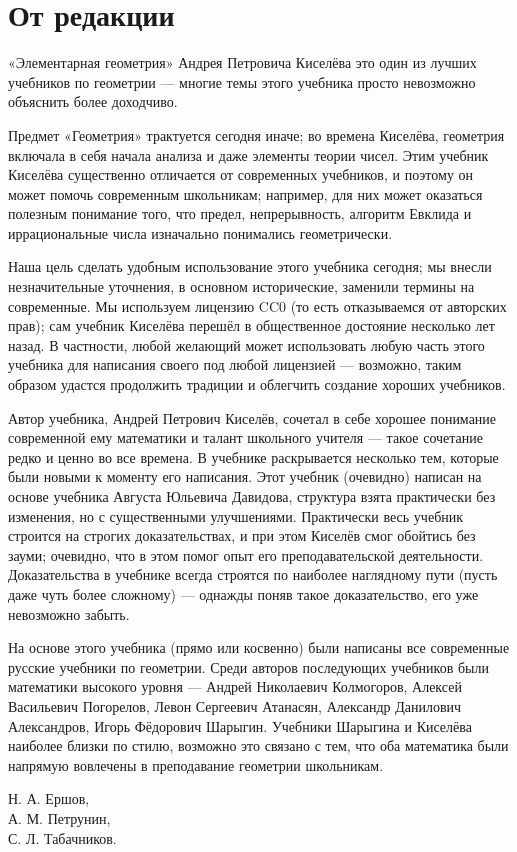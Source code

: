 \section*{От редакции}


«Элементарная геометрия» Андрея Петровича Киселёва это один из лучших учебников по геометрии ---
многие темы этого учебника просто невозможно объяснить более доходчиво.

Предмет «Геометрия» трактуется сегодня иначе;
во времена Киселёва, геометрия включала в себя начала анализа и даже элементы теории чисел.
Этим учебник Киселёва существенно отличается от современных учебников, и поэтому он может помочь современным школьникам;
например, для них может оказаться полезным понимание того, что предел, непрерывность, алгоритм Евклида и иррациональные числа изначально понимались геометрически.

Наша цель сделать удобным использование этого учебника сегодня;
мы внесли незначительные уточнения, в основном исторические, заменили термины на современные. 
Мы используем лицензию CC0 (то есть отказываемся от авторских прав); сам учебник Киселёва перешёл в общественное достояние несколько лет назад.
В частности, любой желающий может использовать любую часть этого учебника для написания своего под любой лицензией ---
возможно, таким образом удастся продолжить традиции и облегчить создание хороших учебников. 

Автор учебника, Андрей Петрович Киселёв, сочетал в себе хорошее понимание современной ему математики и талант школьного учителя --- такое сочетание редко и ценно во все времена.
В учебнике раскрывается несколько тем, которые были новыми к моменту его написания. 
Этот учебник (очевидно) написан на основе учебника Августа Юльевича Давидова, структура взята практически без изменения, но с существенными улучшениями.
Практически весь учебник строится на строгих доказательствах, и при этом Киселёв смог обойтись без зауми;
очевидно, что в этом помог опыт его преподавательской деятельности.
Доказательства в учебнике всегда строятся по наиболее наглядному пути (пусть даже чуть более сложному) --- однажды поняв такое доказательство, его уже невозможно забыть.

На основе этого учебника (прямо или косвенно) были написаны все современные русские учебники по геометрии.
Среди авторов последующих учебников были математики высокого уровня --- Андрей Николаевич Колмогоров, Алексей Васильевич Погорелов, Левон Сергеевич Атанасян,  Александр Данилович Александров, Игорь Фёдорович Шарыгин.
Учебники Шарыгина и Киселёва наиболее близки по стилю, возможно это связано с тем, что оба математика были напрямую вовлечены в преподавание геометрии школьникам.


\begin{flushright}
Н. А. Ершов,\\ 
А. М. Петрунин,\\ 
С. Л. Табачников.        
\end{flushright}
\clearpage
